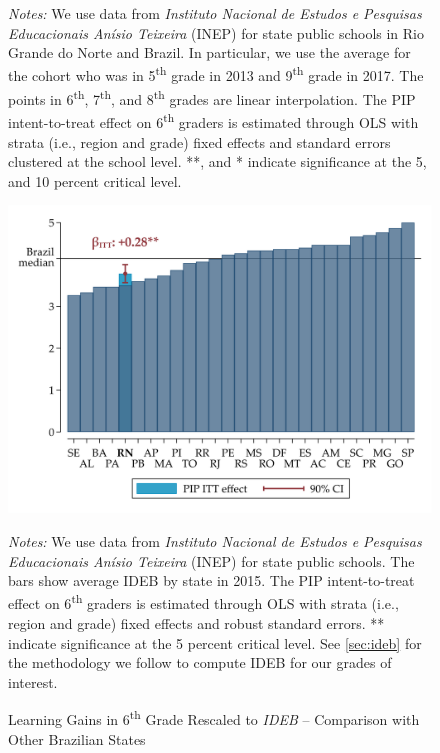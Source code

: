 \documentclass[11pt,a4paper]{article}
\begin{document}
\begin{figure}[ht!]
    \begin{minipage}{0.825\textwidth}
        \small{\textit{Notes:} We use data from \textit{Instituto Nacional de Estudos e Pesquisas Educacionais Anísio Teixeira} (INEP) for state public schools in Rio Grande do Norte and Brazil. In particular, we use the average for the cohort who was in 5\textsuperscript{th} grade in 2013 and 9\textsuperscript{th} grade in 2017. The points in 6\textsuperscript{th}, 7\textsuperscript{th}, and 8\textsuperscript{th} grades are linear interpolation. The PIP intent-to-treat effect on 6\textsuperscript{th} graders is estimated through OLS with strata (i.e., region and grade) fixed effects and standard errors clustered at the school level. **, and * indicate significance at the 5, and 10 percent critical level.}
    \end{minipage}
    
\end{figure}

\vfill
\begin{figure}[ht!]
    \centering
    \caption{Learning Gains in 6\textsuperscript{th} Grade Rescaled to \textit{IDEB} -- Comparison with Other Brazilian States}
    
    \includegraphics[width=14cm]{DataWork/Output/Figures/figA5-itt_IDEB.png}
    \label{fig:itt_IDEB}
    
    \begin{minipage}{0.825\textwidth}
        \small{\textit{Notes:} We use data from \textit{Instituto Nacional de Estudos e Pesquisas Educacionais Anísio Teixeira} (INEP) for state public schools. The bars show average IDEB by state in 2015. The PIP intent-to-treat effect on 6\textsuperscript{th} graders is estimated through OLS with strata (i.e., region and grade) fixed effects and robust standard errors. ** indicate significance at the 5 percent critical level. See \ref{sec:ideb} for the methodology we follow to compute IDEB for our grades of interest.}
    \end{minipage}
    
\end{figure}
\vfill
\end{document}
